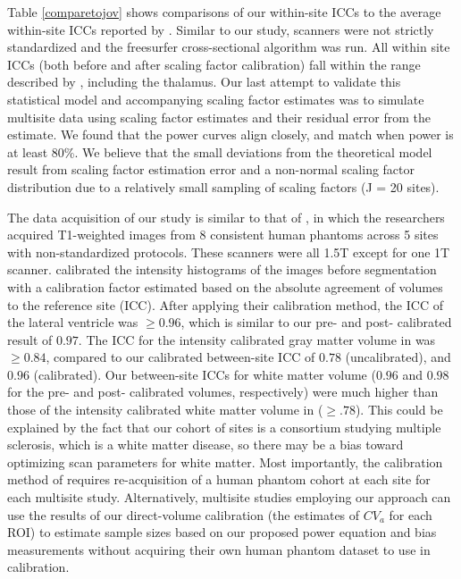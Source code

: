 Table \ref{comparetojov} shows comparisons of our within-site ICCs to the average within-site ICCs reported by \cite{jovicich2013brain}. Similar to our study, scanners were not strictly standardized and the freesurfer cross-sectional algorithm was run. All within site ICCs (both before and after scaling factor calibration) fall within the range described by \cite{jovicich2013brain}, including the thalamus. 
Our last attempt to validate this statistical model and accompanying scaling factor estimates was to simulate multisite data using scaling factor estimates and their residual error from the estimate. We found that the power curves align closely, and match when power is at least 80\%. We believe that the small deviations from the theoretical model result from scaling factor estimation error and a non-normal scaling factor distribution due to a relatively small sampling of scaling factors (J = 20 sites).  

The data acquisition of our study is similar to that of \cite{Schnack_2004}, in which the researchers acquired T1-weighted images from 8 consistent human phantoms across 5 sites with non-standardized protocols. These scanners were all 1.5T except for one 1T scanner. \cite{Schnack_2004} calibrated the intensity histograms of the images before segmentation with a calibration factor estimated based on the absolute agreement of volumes to the reference site (ICC). After applying their calibration method, the ICC of the lateral ventricle was $\geq 0.96$, which is similar to our pre- and post- calibrated result of $0.97$. The ICC for the intensity calibrated gray matter volume in \cite{Schnack_2004} was $\geq 0.84$, compared to our calibrated between-site ICC of $0.78$ (uncalibrated), and $0.96$ (calibrated). Our between-site ICCs for white matter volume ($0.96$ and $0.98$ for the pre- and post- calibrated volumes, respectively) were much higher than those of the intensity calibrated  white matter volume in \cite{Schnack_2004} ($\geq .78$). This could be explained by the fact that our cohort of sites is a consortium studying multiple sclerosis, which is a white matter disease, so there may be a bias toward optimizing scan parameters for white matter. Most importantly, the calibration method of \cite{Schnack_2004} requires re-acquisition of a human phantom cohort at each site for each multisite study. Alternatively, multisite studies employing our approach can use the results of our direct-volume calibration (the estimates of $CV_a$ for each ROI) to estimate sample sizes based on our proposed power equation and bias measurements without acquiring their own human phantom dataset to use in calibration.
